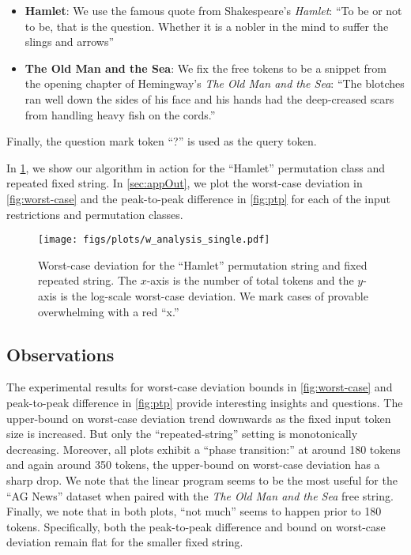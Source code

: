 \begin{itemize}[nosep]
	\item \textbf{Hamlet}: We use the famous quote from Shakespeare's \emph{Hamlet}:
    ``To be or not to be, that is the question. Whether it is a nobler in the mind to suffer the slings and arrows''

	\item \textbf{The Old Man and the Sea}: We fix the free tokens to be a snippet from the opening chapter of Hemingway's \emph{The Old Man and the Sea}:
		 ``The blotches ran well down the sides of his face and his hands had the deep-creased scars from handling heavy fish on the cords.''	
\end{itemize}

Finally, the question mark token ``?'' is used as the query token.

In \cref{fig:smallex}, we show our algorithm in action for the ``Hamlet'' permutation class and repeated fixed string.
In \cref{sec:appOut}, we plot the worst-case deviation in \cref{fig:worst-case} and the peak-to-peak difference in \cref{fig:ptp} for each of the input restrictions and permutation classes.

\begin{figure}
    \centering
\texttt{[image: figs/plots/w\_analysis\_single.pdf]}
    \caption{
        Worst-case deviation for the ``Hamlet'' permutation string and fixed repeated string.
        The $x$-axis is the number of total tokens and the $y$-axis is the log-scale worst-case deviation.
        We mark cases of provable overwhelming with a red ``x.''
    }
    \label{fig:smallex}
\end{figure}

\subsection*{Observations}
The experimental results for worst-case deviation bounds in \cref{fig:worst-case} and peak-to-peak difference in \cref{fig:ptp} provide interesting insights and questions.
The upper-bound on worst-case deviation trend downwards as the fixed input token size is increased.
But only the ``repeated-string'' setting is monotonically decreasing.
Moreover, all plots exhibit a ``phase transition:'' at around 180 tokens and again around 350 tokens, the upper-bound on worst-case deviation has a sharp drop.
We note that the linear program seems to be the most useful for the ``AG News'' dataset when paired with the \emph{The Old Man and the Sea} free string.
Finally, we note that in both plots, ``not much'' seems to happen prior to 180 tokens.
Specifically, both the peak-to-peak difference and bound on worst-case deviation remain flat for the smaller fixed string.

